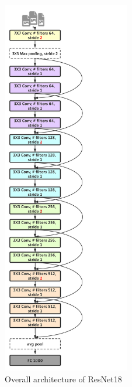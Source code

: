 \begin{figure}[h]
	\begin{center}
		\begin{subfigure}[t]{0.49\textwidth}
		    \centering
			\includegraphics[height=6.5in]{thesis-template-master/images/res18.pdf}
			\caption{Overall architecture of ResNet18}
			\label{fig:res18}
		\end{subfigure}
		\begin{subfigure}[t]{0.49\textwidth}
		    \centering

\end{subfigure}
\end{center}
\end{figure}
